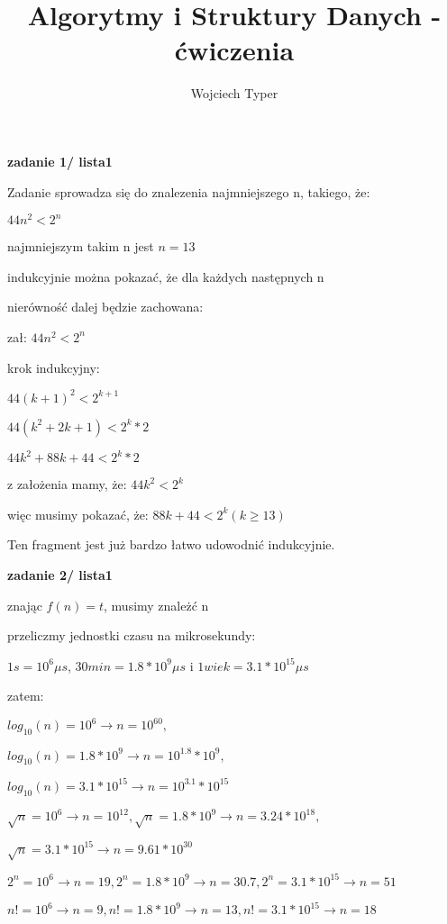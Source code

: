 \documentclass{article}
\title{Algorytmy i Struktury Danych - ćwiczenia}
\author{Wojciech Typer}
\date{}
\begin{document}
\maketitle
\textbf{zadanie 1/ lista1} \par
Zadanie sprowadza się do znalezenia najmniejszego n, 
takiego, że: \par
$44n^2 < 2^n$ \par
najmniejszym takim n jest $n = 13$ \par
indukcyjnie można pokazać, że dla każdych następnych n \par
nierówność dalej będzie zachowana: \par
zał: $44n^2 < 2^n$ \par
krok indukcyjny: \par
$44(k + 1)^2 < 2^{k + 1}$ \par
$44(k^2 + 2k + 1) < 2^k * 2$ \par
$44k^2 + 88k + 44 < 2^k * 2$ \par
z założenia mamy, że: $44k^2 < 2^k$ \par
więc musimy pokazać, że: $88k + 44 < 2^k (k \geq 13)$ \par
Ten fragment jest już bardzo łatwo udowodnić indukcyjnie.  \par

\vspace{1\baselineskip}
\textbf{zadanie 2/ lista1} \par
znając $f(n) = t$, musimy znależć n \par
przeliczmy jednostki czasu na mikrosekundy: \par
$1s = 10^6 \mu s$, $30min = 1.8 * 10^9 \mu s$ i $1 wiek = 3.1 * 10^15 \mu s$\par
zatem: \par
$log_{10}(n) = 10^6  \rightarrow n = 10^{60},$ \par $ log_{10}(n) = 1.8 * 10^9  \rightarrow n = 10^1.8 * 10^9,$ \par $ log_{10}(n) = 3.1 * 10^{15}  \rightarrow n = 10^3.1 * 10^{15}$ \par
$\sqrt{n} = 10^6  \rightarrow n = 10^{12}, \sqrt{n} = 1.8 * 10^9  \rightarrow n = 3.24 * 10^{18},$ \par $ \sqrt{n} = 3.1 * 10^{15}  \rightarrow n = 9.61 * 10^{30}$ \par
$2^n = 10^6  \rightarrow n = 19, 2^n = 1.8 * 10^9  \rightarrow n = 30.7, 2^n = 3.1 * 10^{15}  \rightarrow n = 51$ \par
$n! = 10^6  \rightarrow n = 9, n! = 1.8 * 10^9  \rightarrow n = 13, n! = 3.1 * 10^{15}  \rightarrow n = 18$ \par
\end{document}
